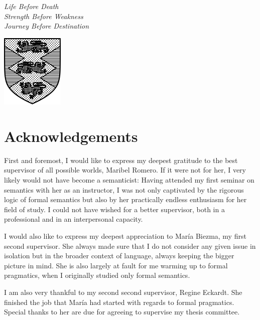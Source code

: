 \cleardoublepage%
\thispagestyle{empty}
%
\hbox{}\vskip 10mm
\begin{flushright}\doublespacing
\textit{\LARGE Life Before Death}\\
\textit{\LARGE Strength Before Weakness}\\
\textit{\LARGE Journey Before Destination}\\\vskip -2mm
\end{flushright}
\enlargethispage{3\baselineskip}\vfill
\begin{center}\singlespacing
\includegraphics[width=30mm]{content/graphics/coa_hatched.pdf}
\end{center}

\cleardoublepage
\section*{Acknowledgements}%
First and foremost, I would like to express my deepest gratitude to the best supervisor of all possible worlds, Maribel Romero. If it were not for her, I very likely would not have become a semanticist: Having attended my first seminar on semantics with her as an instructor, I was not only captivated by the rigorous logic of formal semantics but also by her practically endless enthusiasm for her field of study. I could not have wished for a better supervisor, both in a professional and in an interpersonal capacity.

I would also like to express my deepest appreciation to Mar\'ia Biezma, my first second supervisor. She always made sure that I do not consider any given issue in isolation but in the broader context of language, always keeping the bigger picture in mind. She is also largely at fault for me warming up to formal pragmatics, when I originally studied only formal semantics.

I am also very thankful to my second second supervisor, Regine Eckardt. She finished the job that Mar\'ia had started with regards to formal pragmatics. Special thanks to her are due for agreeing to supervise my thesis committee.

